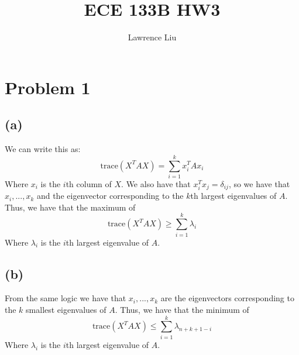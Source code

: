 \documentclass[11pt]{article}
\author{Lawrence Liu}
\title{ECE 133B HW3}
\begin{document}
\maketitle
\section*{Problem 1}
\subsection*{(a)}
We can write this as:
$$\text{trace}(X^TAX)=\sum_{i=1}^k x_i^T A x_i$$
Where $x_i$ is the $i$th column of $X$. We also have that $x_i^Tx_j = \delta_{ij}$, so we have that 
$x_i,...,x_k$ and the eigenvector corresponding to the
$k$th largest eigenvalues of $A$. Thus, we have that the maximum of 
$$\text{trace}(X^TAX)\geq \sum_{i=1}^k \lambda_i$$
Where $\lambda_i$ is the $i$th largest eigenvalue of $A$.
\subsection*{(b)}
From the same logic we have that $x_i,...,x_k$ are the eigenvectors corresponding to the $k$ smallest eigenvalues of $A$.
 Thus, we have that the minimum of 
$$\text{trace}(X^TAX)\leq \sum_{i=1}^k \lambda_{n+k+1-i}$$
Where $\lambda_i$ is the $i$th largest eigenvalue of $A$.
\end{document}
